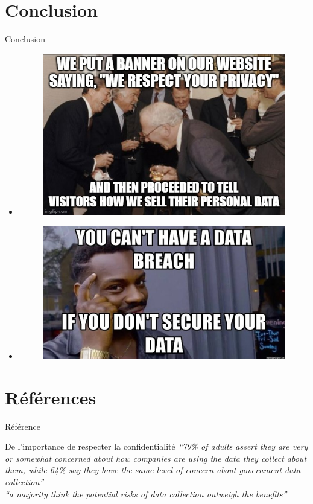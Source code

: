 \documentclass[10pt,serif]{beamer}
\begin{document}
\section{Conclusion}
  \begin{frame}{Conclusion}
    \begin{itemize}
      \item \begin{figure}
        \centering
        \includegraphics[width=.5\textwidth]{"./presentation/figures/4fu76u.jpg"}
      \end{figure}
      \item \begin{figure}
        \centering
        \includegraphics[width=.5\textwidth]{"./presentation/figures/Data-breach-memes.jpg"}
      \end{figure}
    \end{itemize}
  \end{frame}

\section{Références}

  \begin{frame}[allowframebreaks]{Référence}
    \printbibliography
  \end{frame}

  \appendix

  \begin{frame}{De l'importance de respecter la confidentialité}
    \textit{``79\% of adults assert they are very or somewhat concerned about how companies are using the data they collect about them, while 64\% say they have the same level of concern about government data collection'' }\\
      
    \textit{``a majority think the potential risks of data collection outweigh the benefits''}\\

  \end{frame}
\end{document}
